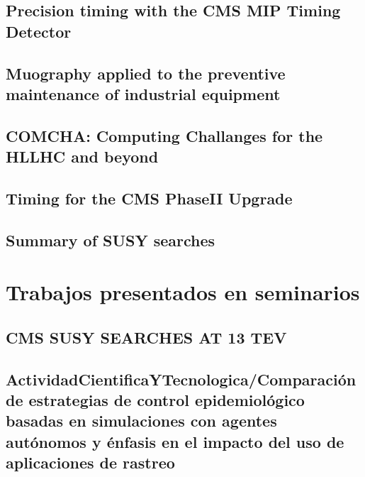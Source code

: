 \documentclass[a4paper, 11pt, twoside, openright]{report}
\begin{document}
\subsection{Precision timing with the CMS MIP Timing Detector}

\subsection{Muography applied to the preventive maintenance of industrial equipment}

\subsection{COMCHA: Computing Challanges for the HLLHC and beyond}

\subsection{Timing for the CMS PhaseII Upgrade}

\subsection{Summary of SUSY searches}



\section{Trabajos presentados en seminarios}

\subsection{CMS SUSY SEARCHES AT 13 TEV}


\subsection{ActividadCientificaYTecnologica/Comparación de estrategias de control epidemiológico basadas en simulaciones con agentes autónomos y énfasis en el impacto del uso de aplicaciones de rastreo}

\end{document}
